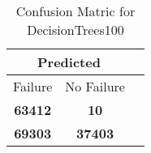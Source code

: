 \begin{table}[] 
\caption{Confusion Matric for DecisionTrees100} 
\label{Table: Prediction Accuracy-NoneDecisionTrees100DecisionTrees100EKF-ignoresolarPanelDipole100.9EKF-top2-solarPanelDipole} 
\centering 
\begin{tabular} 
 {@{}ccc@{}} 
\toprule 
\multicolumn{2}{c}{\textbf{Predicted}}
 \\ \midrule 
\multicolumn{1}{|c|}{Failure} & 
\multicolumn{1}{c|}{No Failure}
 \\ \midrule 
\multicolumn{1}{|c|}{\color{red}\textbf{63412}} & 
\multicolumn{1}{c|}{\color{red}\textbf{10}}
 \\ \midrule 
\multicolumn{1}{|c|}{\color{green}\textbf{69303}} & 
\multicolumn{1}{c|}{\color{green}\textbf{37403}}
 \\ \bottomrule 
\end{tabular} 
\end{table} 
